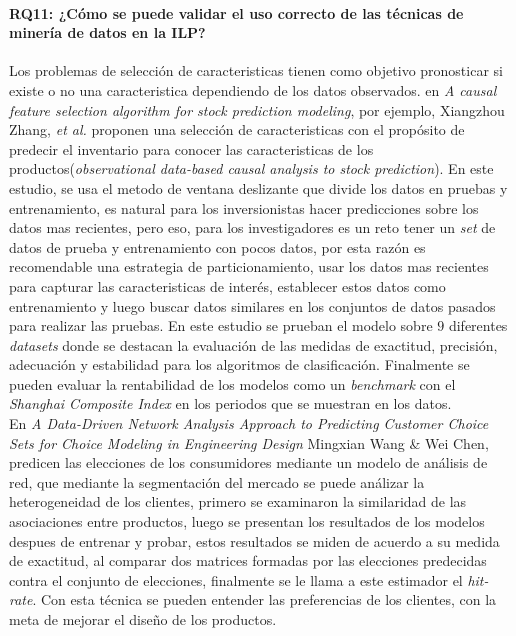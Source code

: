 \paragraph{RQ11: ¿Cómo se puede validar el uso correcto de las técnicas de minería de datos en la ILP?} 
Los problemas de selección de caracteristicas tienen como objetivo pronosticar si existe o no una caracteristica dependiendo de los datos observados. en \textit{A causal feature selection algorithm for stock prediction modeling}\cite{Zhang2014}, por ejemplo, Xiangzhou Zhang, \textit{et al.} proponen una selección de caracteristicas con el propósito de predecir el inventario para conocer las caracteristicas de los productos(\textit{observational data-based causal analysis to stock prediction}). En este estudio, se usa el metodo de ventana deslizante que divide los datos en pruebas y entrenamiento, es natural para los inversionistas hacer predicciones sobre los datos mas recientes, pero eso, para los investigadores es un reto  tener un \textit{set} de datos de prueba y entrenamiento con pocos datos, por esta razón es recomendable una estrategia de particionamiento, usar los datos mas recientes para capturar las caracteristicas de interés, establecer estos datos como entrenamiento y luego buscar datos similares en los conjuntos de datos pasados para realizar las pruebas. En este estudio se prueban el modelo sobre $9$ diferentes \textit{datasets} donde se destacan la evaluación de las medidas de exactitud, precisión, adecuación y estabilidad para los algoritmos de clasificación. Finalmente se pueden evaluar la rentabilidad de los modelos como un \textit{benchmark} con el \textit{Shanghai Composite Index} en los periodos que se muestran en los datos.\\
En \textit{A Data-Driven Network Analysis Approach to Predicting Customer Choice Sets for Choice Modeling in Engineering Design}\cite{Wang2015} Mingxian Wang \& Wei Chen, predicen las elecciones de los consumidores mediante un modelo de análisis de red, que mediante la segmentación del mercado se puede análizar la heterogeneidad de los clientes, primero se examinaron la similaridad de las asociaciones entre productos, luego se presentan los resultados de los modelos despues de entrenar  y probar, estos resultados se miden de acuerdo a su medida de exactitud, al comparar dos matrices formadas por las elecciones predecidas contra el conjunto de elecciones, finalmente se le llama a este estimador el \textit{hit-rate}.  Con esta técnica se pueden entender las preferencias de los clientes, con la meta de mejorar el diseño de los productos. \\
